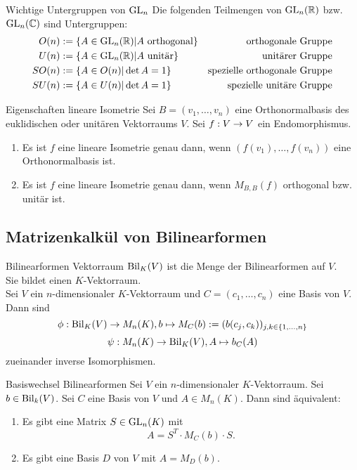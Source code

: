 \documentclass[main.tex]{subfiles}
\begin{document}
\begin{karte}{Wichtige Untergruppen von \(\operatorname{GL}_n\)}
    Die folgenden Teilmengen von \(\operatorname{GL}_n(\mathbb{R})\) bzw. \(\operatorname{GL}_n(\mathbb{C})\) sind Untergruppen:
    \begin{align*}
        O(n) &:= \{A \in \operatorname{GL}_n(\mathbb{R}) \vert A \text{ orthogonal}\} &\text{orthogonale Gruppe}\\
        U(n) &:= \{A \in \operatorname{GL}_n(\mathbb{R}) \vert A \text{ unitär}\} &\text{unitärer Gruppe}\\
        SO(n) &:= \{A \in O(n) \vert \det A = 1\} &\text{spezielle orthogonale Gruppe}\\
        SU(n) &:= \{A \in U(n) \vert \det A = 1\} &\text{spezielle unitäre Gruppe}
    \end{align*}
\end{karte}

\begin{karte}{Eigenschaften lineare Isometrie}
    Sei \(B = (v_1, \ldots, v_n)\) eine Orthonormalbasis des euklidischen oder unitären 
    Vektorraums \(V\). Sei \(f : V \rightarrow V\) ein Endomorphismus.
    \begin{enumerate}
        \item Es ist \(f\) eine lineare Isometrie genau dann, wenn \((f(v_1), \ldots, f(v_n))\)
        eine Orthonormalbasis ist.
        \item Es ist \(f\) eine lineare Isometrie genau dann, wenn \(M_{B,B}(f)\) orthogonal 
        bzw. unitär ist.
    \end{enumerate}
\end{karte}

\subsection*{Matrizenkalkül von Bilinearformen}

\begin{karte}{Bilinearformen Vektorraum}
    \( \operatorname{Bil}_K(V) \) ist die Menge der 
    Bilinearformen auf \( V \). \\
    Sie bildet einen \( K \)-Vektorraum.\\
    Sei \( V \) ein \(n\)-dimensionaler \(K\)-Vektorraum 
    und \( C=(c_1, \ldots, c_n) \) eine Basis von \(V\).
    Dann sind  
    \[ \phi : \operatorname{Bil}_K(V) \rightarrow M_n(K), b\mapsto M_C(b) := (b(c_j, c_k))_{j,k\in\{1,\ldots,n\}} \]
    \[ \psi : M_n(K) \rightarrow \operatorname{Bil}_K(V), A \mapsto b_C(A) \]
    zueinander inverse Isomorphismen.
\end{karte}

\begin{karte}{Basiswechsel Bilinearformen}
    Sei \(V\) ein \(n\)-dimensionaler \(K\)-Vektorraum. 
    Sei \( b\in \operatorname{Bil}_k(V) \). Sei \(C\) eine Basis 
    von \(V\) und \(A\in M_n(K)\). Dann sind 
    äquivalent:
    \begin{enumerate}
        \item Es gibt eine Matrix \(S\in \operatorname{GL}_n(K)\) mit 
        \[ A=S^T \cdot M_C(b) \cdot S. \]
        \item Es gibt eine Basis \( D \) von \(V\) mit
        \(A=M_D(b)\).
    \end{enumerate}
\end{karte}
\end{document}
